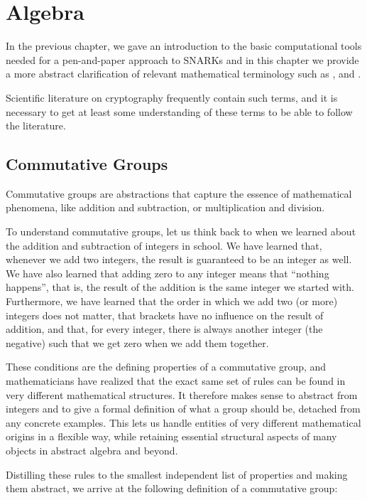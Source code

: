 \chapter{Algebra}
In the previous chapter, we gave an introduction to the basic computational tools needed for a pen-and-paper approach to SNARKs and in this chapter we provide a more abstract clarification of relevant mathematical terminology such as ,  and .

Scientific literature on cryptography frequently contain such terms, and it is necessary to get at least some understanding of these terms to be able to follow the literature.

\section{Commutative Groups}\label{sec:groups}
Commutative groups are abstractions that capture the essence of mathematical phenomena, like addition and subtraction, or multiplication and division.

To understand commutative groups, let us think back to when we learned about the addition and subtraction of integers in school. We have learned that, whenever we add two integers, the result is guaranteed to be an integer as well. We have also learned that adding zero to any integer means that ``nothing happens'', that is, the result of the addition is the same integer we started with. Furthermore, we have learned that the order in which we add two (or more) integers does not matter, that brackets have no influence on the result of addition, and that, for every integer, there is always another integer (the negative) such that we get zero when we add them together.

These conditions are the defining properties of a commutative group, and mathematicians have realized that the exact same set of rules can be found in very different mathematical structures. It therefore makes sense to abstract from integers and to give a formal definition of what a group should be, detached from any concrete examples. This lets us handle entities of very different mathematical origins in a flexible way, while retaining essential structural aspects of many objects in abstract algebra and beyond.

Distilling these rules to the smallest independent list of properties and making them abstract, we arrive at the following definition of a commutative group:


